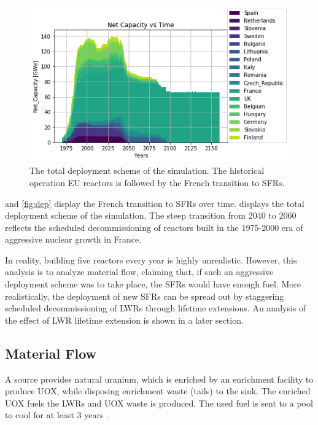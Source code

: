 \begin{figure}[htbp!]
    \begin{center}
        \includegraphics[scale=0.6]{./images/eu_future/onesim.png}
    \end{center}
    \caption{The total deployment scheme of the simulation. The historical
             operation \gls{EU} reactors is followed by the French
             transition to \glspl{SFR}.}
    \label{fig:tot_dep}
\end{figure}


 and \ref{fig:dep} display
the French transition to \glspl{SFR} over time.
 displays the total deployment
scheme of the simulation.
The steep transition from 2040 to 2060 reflects the scheduled
decommissioning of reactors built in the 1975-2000
era of aggressive nuclear growth in France.

In reality, building five reactors every year is highly unrealistic. However,
this analysis is to analyze material flow, claiming that, if such an aggressive
deployment scheme was to take place, the \glspl{SFR} would have enough fuel.
More realistically, the deployment of new \glspl{SFR} can be spread out by
staggering scheduled decommissioning of \glspl{LWR} through lifetime extensions.
An analysis of the effect of \gls{LWR} lifetime extension is shown in a later section.



\subsection{Material Flow}
A source provides natural uranium, which is enriched by an enrichment
facility to produce \gls{UOX}, while disposing enrichment waste (tails)
to the sink. The enriched \gls{UOX} fuels
the \gls{LWR}s and \gls{UOX} waste is produced. The used fuel
is sent to a pool to cool for at least 3 years \cite{carre_overview_2009}.

